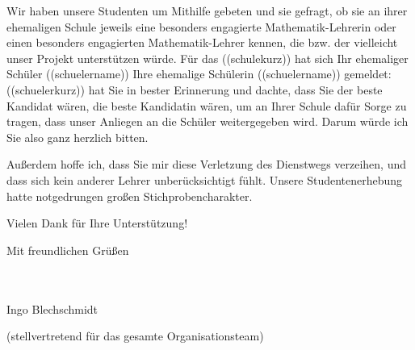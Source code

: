 \documentclass{../../zirkelbrief}
\begin{document}
Wir haben unsere Studenten um Mithilfe gebeten und sie gefragt, ob sie an ihrer
ehemaligen Schule jeweils eine besonders engagierte Mathematik-Lehrerin oder einen besonders
engagierten Mathematik-Lehrer kennen, die bzw. der
vielleicht unser Projekt unterstützen würde. Für das ((schulekurz)) hat sich
\ifschuelermaennlich Ihr ehemaliger Schüler ((schuelername)) \else
Ihre ehemalige Schülerin ((schuelername)) \fi
gemeldet: ((schuelerkurz)) hat Sie in bester
Erinnerung und dachte, dass Sie \iflehrermaennlich der beste Kandidat wären,
\else die beste Kandidatin wären, \fi um an Ihrer Schule dafür Sorge zu tragen,
dass unser Anliegen an die Schüler weitergegeben wird. Darum würde ich Sie also
ganz herzlich bitten.

Außerdem hoffe ich, dass Sie mir diese Verletzung des Dienstwegs verzeihen, und
dass sich kein anderer Lehrer unberücksichtigt fühlt. Unsere Studentenerhebung
hatte notgedrungen großen Stichprobencharakter.

Vielen Dank für Ihre Unterstützung!

Mit freundlichen Grüßen

\ \\
\ \\

Ingo Blechschmidt

\vspace{-0.2cm}

{\small (stellvertretend für das gesamte Organisationsteam)}
\end{document}
